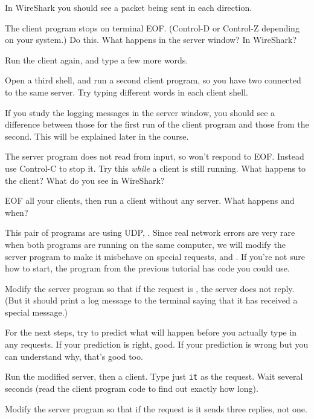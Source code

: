 In WireShark you should see a packet being sent in each direction.

The client program stops on terminal EOF. (Control-D or Control-Z depending on your
system.) Do this. What happens in the server window? In WireShark?

Run the client again, and type a few more words.

Open a third shell, and run a second client program, so you have two connected to the
same server. Try typing different words in each client shell.

\begin{IMPORTANT}
If you study the logging messages in the server window, you should see a difference
between those for the first run of the client program and those from the second.
This will be explained later in the course.
\end{IMPORTANT}

The server program does not read from input, so won't respond to EOF. Instead use
Control-C to stop it. Try this \emph{while} a client is still running. What happens
to the client? What do you see in WireShark?

EOF all your clients, then run a client without any server. What happens and when?



This pair of programs are using UDP, . Since real
network errors are very rare when both programs are running on the same computer,
we will modify the server program to make it misbehave on special requests,
 and . If you're not sure how to start, the  program
from the previous tutorial has code you could use.

\STEP Modify the server program so that if the request is , the server does
not reply. (But it should print a log message to the terminal saying that it has
received a special message.)

\begin{IMPORTANT}
For the next steps, try to predict what will happen before you actually type in any
requests. If your prediction is right, good. If your prediction is wrong but you
can understand why, that's good too.
\end{IMPORTANT}

Run the modified server, then a client. Type just \texttt{it} as the request. Wait
several seconds (read the client program code to find out exactly how long).

\STEP Modify the server program so that if the request is  it sends three replies,
not one.

